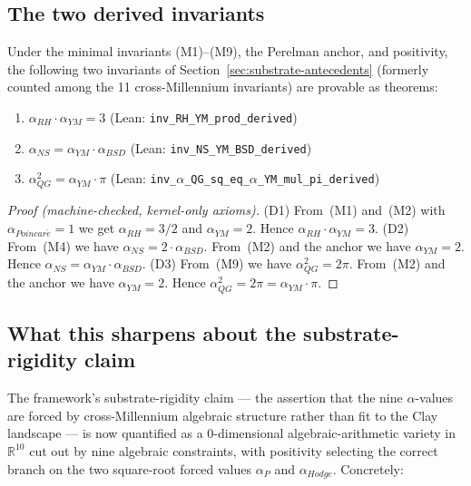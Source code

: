 \subsection{The two derived invariants}
\label{subsec:derived-invariants}

\begin{theorem}
\label{thm:derived-invariants}
Under the minimal invariants (M1)--(M9), the Perelman anchor, and
positivity, the following two invariants of
Section~\ref{sec:substrate-antecedents} (formerly counted among the
11 cross-Millennium invariants) are provable as theorems:
\begin{enumerate}[label=(D\arabic*)]
\item $\alpha_{RH} \cdot \alpha_{YM} = 3$
\hfill\textnormal{(Lean: \texttt{inv\_RH\_YM\_prod\_derived})}
\item $\alpha_{NS} = \alpha_{YM} \cdot \alpha_{BSD}$
\hfill\textnormal{(Lean: \texttt{inv\_NS\_YM\_BSD\_derived})}
\item $\alpha_{QG}^{2} = \alpha_{YM} \cdot \pi$
\hfill\textnormal{(Lean: \texttt{inv\_\allowbreak{}$\alpha$\_\allowbreak{}QG\_\allowbreak{}sq\_\allowbreak{}eq\_\allowbreak{}$\alpha$\_\allowbreak{}YM\_\allowbreak{}mul\_\allowbreak{}pi\_\allowbreak{}derived})}
\end{enumerate}
\end{theorem}

\begin{proof}[Proof (machine-checked, kernel-only axioms)]
(D1) From~(M1) and~(M2) with $\alpha_{Poincar\acute{e}} = 1$ we get
$\alpha_{RH} = 3/2$ and $\alpha_{YM} = 2$. Hence $\alpha_{RH} \cdot
\alpha_{YM} = 3$. (D2) From~(M4) we have $\alpha_{NS} = 2 \cdot
\alpha_{BSD}$. From~(M2) and the anchor we have $\alpha_{YM} = 2$.
Hence $\alpha_{NS} = \alpha_{YM} \cdot \alpha_{BSD}$. (D3) From~(M9)
we have $\alpha_{QG}^{2} = 2\pi$. From~(M2) and the anchor we have
$\alpha_{YM} = 2$. Hence $\alpha_{QG}^{2} = 2\pi = \alpha_{YM} \cdot
\pi$.
\end{proof}

\subsection{What this sharpens about the substrate-rigidity claim}
\label{subsec:rigidity-sharpening}

The framework's substrate-rigidity claim --- the assertion that the
nine $\alpha$-values are forced by cross-Millennium algebraic
structure rather than fit to the Clay landscape --- is now
quantified as a 0-dimensional algebraic-arithmetic variety in
$\mathbb{R}^{10}$ cut out by nine algebraic constraints, with
positivity selecting the correct branch on the two square-root
forced values $\alpha_{P}$ and $\alpha_{Hodge}$. Concretely:

